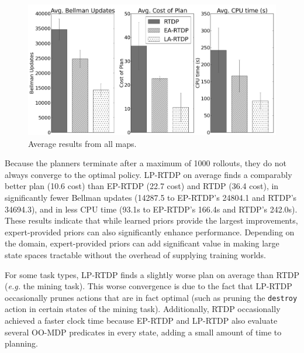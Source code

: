 \documentclass[11pt]{article}
\begin{document}
\begin{figure}[t]
\centering
\includegraphics[width=1\linewidth]{figures/average_results_cropped.png}%
\caption{Average results from all maps.}
\label{fig:average_results}
\end{figure}

Because the planners terminate after a maximum of 1000
rollouts, they do not always converge to the optimal policy. LP-RTDP on
average finds a comparably better plan (10.6 cost) than EP-RTDP (22.7
cost) and RTDP (36.4 cost), in significantly fewer
Bellman updates (14287.5 to EP-RTDP's 24804.1 and RTDP's 34694.3), and in
less CPU time (93.1s to EP-RTDP's 166.4s and RTDP's 242.0s).  These
results indicate that while learned priors provide the largest
improvements, expert-provided priors can also significantly
enhance performance. Depending on the domain, expert-provided priors can add
significant value in making large state spaces tractable without the
overhead of supplying training worlds.

For some task types, LP-RTDP finds a slightly worse plan on average than
RTDP ({\em e.g.} the mining task). This worse convergence is due to the fact that LP-RTDP
occasionally prunes actions that are in fact optimal (such as
pruning the \texttt{destroy} action in certain states of the mining task).
Additionally, RTDP occasionally achieved a faster clock time because EP-RTDP and LP-RTDP also evaluate several OO-MDP predicates in every state, adding a small amount of time to planning.
\end{document}
